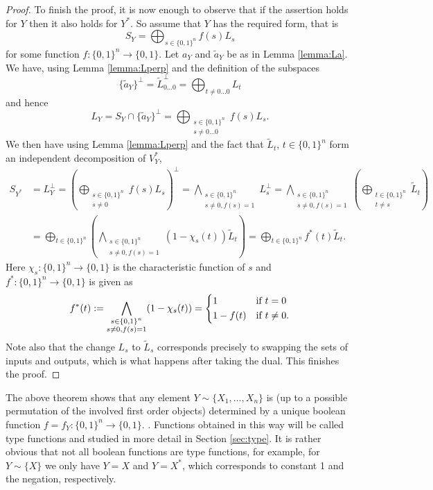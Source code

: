 \documentclass[12pt]{article}
\theoremstyle{definition}
\theoremstyle{remark}
\begin{document}
\begin{proof}
To finish the proof, it is now enough to observe that if the assertion holds for $Y$ then
it also  holds for $Y^*$. So assume that $Y$ has the required form, that is
\[
S_Y=\bigoplus_{s\in\{0,1\}^n}f(s)L_s
\]
for some function $f:\{0,1\}^n\to \{0,1\}$. 
Let $a_Y$ and $\tilde a_Y$ be as in  Lemma \ref{lemma:La}. 
We have, using Lemma \ref{lemma:Lperp} and the definition of the subspaces
\[
\{\tilde a_Y\}^\perp=\tilde L_{0\dots 0}^\perp=\bigoplus_{t\ne 0\dots 0} L_t
\]
and hence
\[
L_Y=S_Y\cap\{\tilde a_Y\}^\perp=\bigoplus_{\substack{s\in \{0,1\}^n\\ s\ne 0\dots 0}} f(s) L_s.
\]
We then have using Lemma \ref{lemma:Lperp} and the fact that $\tilde L_t$, $t\in
\{0,1\}^n$ form an independent decomposition of $V_Y^*$,
\begin{align*}
S_{Y^*}&=L_Y^\perp=\left(\bigoplus_{\substack{s\in \{0,1\}^n\\ s\ne 0}}
f(s)L_s\right)^\perp=\bigwedge_{\substack{s\in\{0,1\}^n\\ s\ne 0, f(s)=1}}L_s^\perp=
\bigwedge_{\substack{s\in\{0,1\}^n\\ s\ne 0,
f(s)=1}}\left(\bigoplus_{\substack{t\in\{0,1\}^n\\t\ne s}} \tilde L_t\right)\\
&=\bigoplus_{t\in\{0,1\}^n} \left(\bigwedge_{\substack{s\in \{0,1\}^n\\ s\ne 0, f(s)=1}}
(1-\chi_s(t))\tilde L_t\right)=\bigoplus_{t\in \{0,1\}^n} f^*(t) \tilde L_t.
\end{align*}
Here $\chi_s:\{0,1\}^n\to \{0,1\}$ is the characteristic function of $s$ and
$f^*:\{0,1\}^n\to \{0,1\}$ is given as
\[
f^*(t):=\bigwedge_{\substack{s\in \{0,1\}^n\\ s\ne 0, f(s)=1}}
(1-\chi_s(t))=\begin{dcases} 1 & \text{if } t=0\\ 1-f(t) & \text{if } t\ne 0.
\end{dcases}
\]
Note also that the change $L_s$ to $\tilde L_s$ corresponds precisely to swapping the sets
of inputs and outputs, which is what happens after taking the dual. This finishes the
proof.

\end{proof}


The above theorem shows that any element $Y\sim\{X_1,\dots,X_n\}$ is (up to a possible permutation
of the involved first order objects)
determined by a unique boolean function $f=f_Y:\{0,1\}^n\to \{0,1\}$. . Functions
obtained in this way will be called type functions and studied in more detail in
Section \ref{sec:type}. 
It is rather obvious that not all boolean functions are type functions, for
example, for $Y\sim \{X\}$ we only have $Y=X$ and $Y=X^*$, which corresponds to constant
1 and the negation, respectively. 
\end{document}
